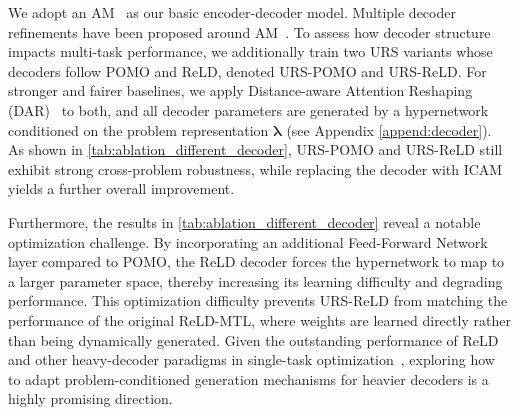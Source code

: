 \documentclass{article}
\theoremstyle{plain}
\theoremstyle{definition}
\theoremstyle{remark}
\begin{document}
\begin{table}[htbp]
  \centering
  \caption{Effect of different decoder architectures on URS cross-problem performance.}
  \label{tab:ablation_different_decoder}%
\end{table}%
We adopt an AM~\citep{kool2019attention} as our basic encoder-decoder model. Multiple decoder refinements have been proposed around AM~\citep{kwon2020pomo,huang2025reld,zhou2024icam}. To assess how decoder structure impacts multi-task performance, we additionally train two URS variants whose decoders follow POMO and ReLD, denoted URS-POMO and URS-ReLD. For stronger and fairer baselines, we apply Distance-aware Attention Reshaping (DAR)~\citep{wang2025distance} to both, and all decoder parameters are generated by a hypernetwork conditioned on the problem representation $\bm{\lambda}$ (see Appendix \ref{append:decoder}). As shown in \cref{tab:ablation_different_decoder}, URS-POMO and URS-ReLD still exhibit strong cross-problem robustness, while replacing the decoder with ICAM~\citep{zhou2024icam} yields a further overall improvement.

Furthermore, the results in \cref{tab:ablation_different_decoder} reveal a notable optimization challenge. By incorporating an additional Feed-Forward Network layer compared to POMO, the ReLD decoder forces the hypernetwork to map to a larger parameter space, thereby increasing its learning difficulty and degrading performance. This optimization difficulty prevents URS-ReLD from matching the performance of the original ReLD-MTL, where weights are learned directly rather than being dynamically generated. Given the outstanding performance of ReLD and other heavy-decoder paradigms in single-task optimization~\citep{luo2023lehd,drakulic2023bq}, exploring how to adapt problem-conditioned generation mechanisms for heavier decoders is a highly promising direction.
\end{document}
